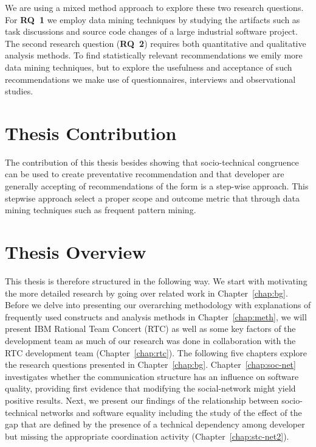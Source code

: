 We are using a mixed method approach to explore these two research questions.
For \textbf{RQ~1} we employ data mining techniques by studying the artifacts such as task discussions and source code changes of a large industrial software project.
The second research question (\textbf{RQ~2}) requires both quantitative and qualitative analysis methods.
To find statistically relevant recommendations we emily more data mining techniques, but to explore the usefulness and acceptance of such recommendations we make use of questionnaires, interviews and observational studies.






\section{Thesis Contribution}
The contribution of this thesis besides showing that socio-technical congruence can be used to create preventative recommendation and that developer are generally accepting of recommendations of the form is a step-wise approach.
This stepwise approach select a proper scope and outcome metric that through data mining techniques such as frequent pattern mining.


\section{Thesis Overview}
This thesis is therefore structured in the following way.
We start with motivating the more detailed research by going over related work in Chapter~\ref{chap:bg}.
Before we delve into presenting our overarching methodology with explanations of frequently used constructs and analysis methods in Chapter~\ref{chap:meth}, we will present IBM Rational Team Concert (RTC) as well as some key factors of the development team as much of our research was done in collaboration with the RTC development team (Chapter~\ref{chap:rtc}).
The following five chapters explore the research questions presented in Chapter~\ref{chap:bg}.
Chapter~\ref{chap:soc-net} investigates whether the communication structure has an influence on software quality, providing first evidence that modifying the social-network might yield positive results.
Next, we present our findings of the relationship between socio-technical networks and software equality including the study of the effect of the gap that are defined by the presence of a technical dependency among developer but missing the appropriate coordination activity (Chapter~\ref{chap:stc-net2}).

